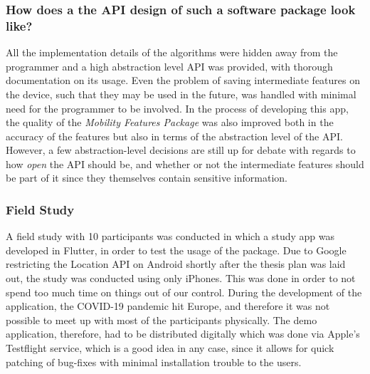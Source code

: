 \subsubsection*{How does a the API design of such a software package look like?}
All the implementation details of the algorithms were hidden away from the programmer and a high abstraction level API was provided, with thorough documentation on its usage. Even the problem of saving intermediate features on the device, such that they may be used in the future, was handled with minimal need for the programmer to be involved. In the process of developing this app, the quality of the \textit{Mobility Features Package}  was also improved both in the accuracy of the features but also in terms of the abstraction level of the API. However, a few abstraction-level decisions are still up for debate with regards to how \textit{open} the API should be, and whether or not the intermediate features should be part of it since they themselves contain sensitive information.

\subsubsection*{Field Study}
A field study with 10 participants was conducted in which a study app was developed in Flutter, in order to test the usage of the package. Due to Google restricting the Location API on Android shortly after the thesis plan was laid out, the study was conducted using only iPhones. This was done in order to not spend too much time on things out of our control. During the development of the application, the COVID-19 pandemic hit Europe, and therefore it was not possible to meet up with most of the participants physically. The demo application, therefore, had to be distributed digitally which was done via Apple's Testflight service, which is a good idea in any case, since it allows for quick patching of bug-fixes with minimal installation trouble to the users.